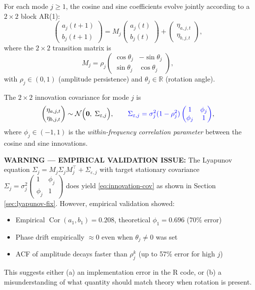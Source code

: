 \documentclass[answers,12pt,addpoints]{exam}
\begin{document}
For each mode $j \ge 1$, the cosine and sine coefficients evolve jointly according to a $2 \times 2$ block AR(1):
\begin{equation}
  \begin{pmatrix} a_j(t+1) \\ b_j(t+1) \end{pmatrix}
  =
  M_j
  \begin{pmatrix} a_j(t) \\ b_j(t) \end{pmatrix}
  +
  \begin{pmatrix} \eta_{a,j,t} \\ \eta_{b,j,t} \end{pmatrix},
  \label{eq:ar1-block}
\end{equation}
where the $2 \times 2$ transition matrix is
\begin{equation}
  M_j
  =
  \rho_j
  \begin{pmatrix}
    \cos\theta_j & -\sin\theta_j \\
    \sin\theta_j & \cos\theta_j
  \end{pmatrix},
  \label{eq:Mj-rotation}
\end{equation}
with $\rho_j \in (0,1)$ (amplitude persistence) and $\theta_j \in \mathbb{R}$ (rotation angle).

The $2 \times 2$ innovation covariance for mode $j$ is
\begin{equation}
  \begin{pmatrix} \eta_{a,j,t} \\ \eta_{b,j,t} \end{pmatrix}
  \sim
  \mathcal{N}\Bigl(\mathbf{0},\; \Sigma_{\varepsilon,j}\Bigr),
  \qquad
  {\color{blue}\Sigma_{\varepsilon,j}
  =
  \sigma_j^2(1 - \rho_j^2)
  \begin{pmatrix} 1 & \phi_j \\ \phi_j & 1 \end{pmatrix}},
  \label{eq:innovation-cov}
\end{equation}
where $\phi_j \in (-1,1)$ is the \emph{within-frequency correlation parameter} between the cosine and sine innovations.

{\color{red}
\textbf{WARNING — EMPIRICAL VALIDATION ISSUE:} The Lyapunov equation $\Sigma_j = M_j \Sigma_j M_j^\top + \Sigma_{\varepsilon,j}$ with target stationary covariance $\Sigma_j = \sigma_j^2 \begin{pmatrix} 1 & \phi_j \\ \phi_j & 1 \end{pmatrix}$ does yield \eqref{eq:innovation-cov} as shown in Section \ref{sec:lyapunov-fix}. However, empirical validation showed:
\begin{itemize}
  \item Empirical $\operatorname{Cor}(a_1, b_1) = 0.208$, theoretical $\phi_1 = 0.696$ (70\% error)
  \item Phase drift empirically $\approx 0$ even when $\theta_j \neq 0$ was set
  \item ACF of amplitude decays faster than $\rho_j^k$ (up to 57\% error for high $j$)
\end{itemize}
This suggests either (a) an implementation error in the R code, or (b) a misunderstanding of what quantity should match theory when rotation is present.
}
\end{document}
